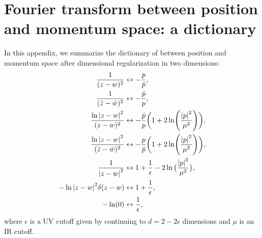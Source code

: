 \documentclass[12pt]{article}
\def\be{\begin{equation}}
\def\ee{\end{equation}}
\numberwithin{equation}{section}
\begin{document}
\section{Fourier transform between position and momentum space: a dictionary}
\label{fourDict}
In this appendix, we summarize the dictionary of \cite{deWit:1993qv, deBoer:1996kt, Mazzucato:2009fv} between position and momentum space after dimensional regularization in two dimensions:
\be
\begin{aligned}
	\frac{1}{(z-w)^2} &\leftrightarrow -\frac{p}{\bar{p}}, \\
	\frac{1}{(\bar{z}-\bar{w})^2} &\leftrightarrow -\frac{\bar{p}}{p}, \\
\frac{\ln\abs{z-w}^2}{(z-w)^2} &\leftrightarrow -\frac{\bar{p}}{p}\biggr(1+2\ln (\frac{\abs{p}^2}{\mu^2})\biggr), \\
\frac{\ln\abs{z-w}^2}{(\bar{z}-\bar{w})^2} &\leftrightarrow -\frac{p}{\bar{p}}\biggr(1+2\ln (\frac{\abs{p}^2}{\mu^2})\biggr), \\
\frac{1}{\abs{z-w}^2} &\leftrightarrow 1 + \frac{1}{\epsilon} - 2\ln\big(\frac{\abs{p}^2}{\mu^2}\big), \\
-\ln\abs{z-w}^2 \delta(z-w) &\leftrightarrow 1 + \frac{1}{\epsilon}, \\
-\ln(0) &\leftrightarrow \frac{1}{\epsilon},
\end{aligned}
\ee
where $\epsilon$ is a UV cutoff given by continuing to $d = 2 - 2\epsilon$ dimensions and $\mu$ is an IR cutoff.
\clearpage
\printbibliography
\end{document}
